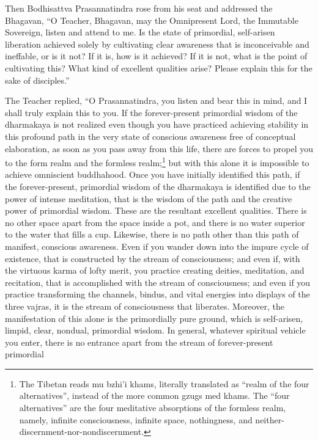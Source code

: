 \documentclass[a4paper,11pt,twoside,final]{book}
\begin{document}
Then Bodhisattva Prasannatindra rose from his seat and addressed the
Bhagavan, ``O Teacher, Bhagavan, may the Omnipresent Lord, the
Immutable Sovereign, listen and attend to me. Is the state of
primordial, self-arisen liberation achieved solely by cultivating
clear awareness that is inconceivable and ineffable, or is it not? If
it is, how is it achieved? If it is not, what is the point of
cultivating this? What kind of excellent qualities arise? Please
explain this for the sake of disciples.''

The Teacher replied, ``O Prasannatindra, you listen and bear this in
mind, and I shall truly explain this to you. If the forever-present
primordial wisdom of the dharmakaya is not realized even though you
have practiced achieving stability in this profound path in the very
state of conscious awareness free of conceptual elaboration, as soon
as you pass away from this life, there are forces to propel you to the
form realm and the formless realm;\footnote{The Tibetan reads mu
  bzhi'i khams, literally translated as ``realm of the four
  alternatives'', instead of the more common gzugs med khams. The
  ``four alternatives'' are the four meditative absorptions of the
  formless realm, namely, infinite consciousness, infinite space,
  nothingness, and neither-discernment-nor-nondiscernment.} but with
this alone it is impossible to achieve omniscient buddhahood. Once you
have initially identified this path, if the forever-present,
primordial wisdom of the dharmakaya is identified due to the power of
intense meditation, that is the wisdom of the path and the creative
power of primordial wisdom.  These are the resultant excellent
qualities. There is no other space apart from the space inside a pot,
and there is no water superior to the water that fills a
cup. Likewise, there is no path other than this path of manifest,
conscious awareness. Even if you wander down into the impure cycle of
existence, that is constructed by the stream of consciousness; and
even if, with the virtuous karma of lofty merit, you practice creating
deities, meditation, and recitation, that is accomplished with the
stream of consciousness; and even if you practice transforming the
channels, bindus, and vital energies into displays of the three
vajras, it is the stream of consciousness that liberates. Moreover,
the manifestation of this alone is the primordially pure ground, which
is self-arisen, limpid, clear, nondual, primordial wisdom.  In
general, whatever spiritual vehicle you enter, there is no entrance
apart from the stream of forever-present primordial
\end{document}
